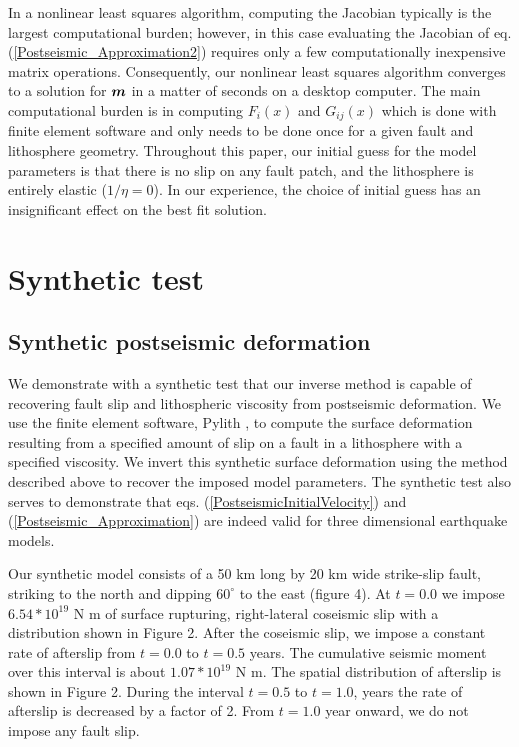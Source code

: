 \documentclass[extra]{gji}
\begin{document}
In a nonlinear least squares algorithm, computing the Jacobian
typically is the largest computational burden; however, in this case
evaluating the Jacobian of eq. (\ref{Postseismic_Approximation2})
requires only a few computationally inexpensive matrix operations.
Consequently, our nonlinear least squares algorithm converges to a
solution for $\mitbf{m}$ in a matter of seconds on a desktop computer.
The main computational burden is in computing $F_i(x)$ and $G_{ij}(x)$
which is done with finite element software and only needs to be done
once for a given fault and lithosphere geometry. Throughout this
paper, our initial guess for the model parameters is that there is no
slip on any fault patch, and the lithosphere is entirely elastic
($1/\eta = 0$).  In our experience, the choice of initial guess has an
insignificant effect on the best fit solution.

\section{Synthetic test}
\subsection{Synthetic postseismic deformation}

We demonstrate with a synthetic test that our inverse method is
capable of recovering fault slip and lithospheric viscosity from
postseismic deformation.  We use the finite element software, Pylith
\citep{A2007}, to compute the surface deformation resulting from a
specified amount of slip on a fault in a lithosphere with a specified
viscosity.  We invert this synthetic surface deformation using the
method described above to recover the imposed model parameters.  The
synthetic test also serves to demonstrate that
eqs. (\ref{PostseismicInitialVelocity}) and
(\ref{Postseismic_Approximation}) are indeed valid for three
dimensional earthquake models.

Our synthetic model consists of a 50 km long by 20 km wide strike-slip
fault, striking to the north and dipping $60^{\circ}$ to the east (figure
4). At $t=0.0$ we impose $6.54*10^{19}$ N m of surface rupturing,
right-lateral coseismic slip with a distribution shown in Figure 2.
After the coseismic slip, we impose a constant rate of afterslip from
$t=0.0$ to $t=0.5$ years.  The cumulative seismic moment over this
interval is about $1.07*10^{19}$ N m.  The spatial distribution of
afterslip is shown in Figure 2.  During the interval $t=0.5$ to
$t=1.0$, years the rate of afterslip is decreased by a factor of 2.
From $t=1.0$ year onward, we do not impose any fault slip.
\end{document}
